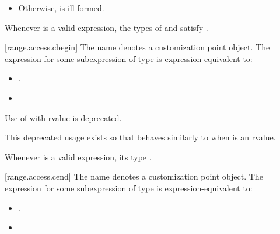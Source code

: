 {\begin{itemize}
\item
  Otherwise,  is ill-formed.
\end{itemize}

\pnum
\begin{note}
Whenever  is a valid expression, the
types of  and  satisfy
.
\end{note}

[range.access.cbegin]{}
\pnum
The name  denotes a customization point
object. The expression
 for some subexpression  of type 
is expression-equivalent to:
\begin{itemize}
\item {} .
\item {}
\end{itemize}

{\color{oldclr}
\pnum
Use of  with rvalue  is deprecated.
\begin{note}
This deprecated usage exists so that 
behaves similarly to   when
 is an rvalue.
\end{note}
} %

\pnum
\begin{note}
Whenever  is a valid expression, its
type   .
\end{note}

[range.access.cend]{}
\pnum
The name  denotes a customization point
object. The expression
 for some subexpression  of type 
is expression-equivalent to:

\begin{itemize}
\item {}.
\item {}
\end{itemize}

}
